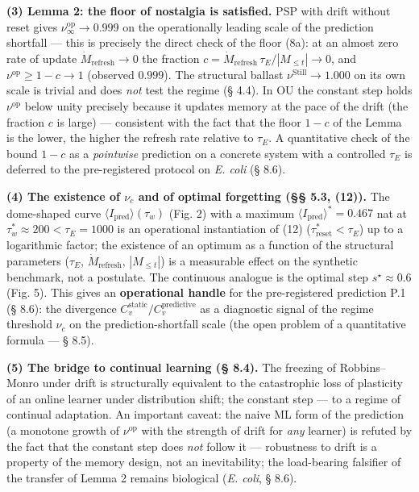 \documentclass[pdflatex,sn-mathphys-ay]{sn-jnl}
\begin{document}
\textbf{(3) Lemma 2: the floor of nostalgia is satisfied.} PSP with drift without reset gives \(\nu^{\text{op}}_\infty \to 0.999\) on the operationally leading scale of the prediction shortfall --- this is precisely the direct check of the floor (8a): at an almost zero rate of update \(\dot M_{\text{refresh}} \to 0\) the fraction \(c = \dot M_{\text{refresh}}\,\tau_E/|M_{\le t}| \to 0\), and \(\nu^{\text{op}} \ge 1 - c \to 1\) (observed \(0.999\)). The structural ballast \(\nu^{\text{Still}} \to 1.000\) on its own scale is trivial and does \emph{not} test the regime (§ 4.4). In OU the constant step holds \(\nu^{\text{op}}\) below unity precisely because it updates memory at the pace of the drift (the fraction \(c\) is large) --- consistent with the fact that the floor \(1-c\) of the Lemma is the lower, the higher the refresh rate relative to \(\tau_E\). A quantitative check of the bound \(1-c\) as a \emph{pointwise} prediction on a concrete system with a controlled \(\tau_E\) is deferred to the pre-registered protocol on \emph{E. coli} (§ 8.6).



\textbf{(4) The existence of \(\nu_c\) and of optimal forgetting (§§ 5.3, (12)).} The dome-shaped curve \(\langle I_{\text{pred}} \rangle(\tau_w)\) (Fig. 2) with a maximum \(\langle I_{\text{pred}}\rangle^* = 0.467\) nat at \(\tau_w^* \approx 200 < \tau_E = 1000\) is an operational instantiation of (12) (\(\tau_{\text{reset}}^* < \tau_E\)) up to a logarithmic factor; the existence of an optimum as a function of the structural parameters (\(\tau_E\), \(\dot M_{\text{refresh}}\), \(|M_{\le t}|\)) is a measurable effect on the synthetic benchmark, not a postulate. The continuous analogue is the optimal step \(s^\star \approx 0.6\) (Fig. 5). This gives an \textbf{operational handle} for the pre-registered prediction P.1 (§ 8.6): the divergence \(C_v^{\text{static}}/C_v^{\text{predictive}}\) as a diagnostic signal of the regime threshold \(\nu_c\) on the prediction-shortfall scale (the open problem of a quantitative formula --- § 8.5).



\textbf{(5) The bridge to continual learning (§ 8.4).} The freezing of Robbins--Monro under drift is structurally equivalent to the catastrophic loss of plasticity of an online learner under distribution shift; the constant step --- to a regime of continual adaptation. An important caveat: the naive ML form of the prediction (a monotone growth of \(\nu^{\text{op}}\) with the strength of drift for \emph{any} learner) is refuted by the fact that the constant step does \emph{not} follow it --- robustness to drift is a property of the memory design, not an inevitability; the load-bearing falsifier of the transfer of Lemma 2 remains biological (\emph{E. coli}, § 8.6).
\end{document}
